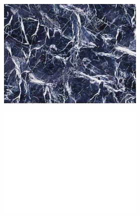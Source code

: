 \begin{figure}[]
    \centering    
    \begin{subfigure}{\textwidth}
        \centering
        \begin{subfigure}{0.19\textwidth}
            \centering
            \includegraphics[width=\textwidth]{images/04-experiment02/isolating_issues/target.jpg}
            \caption*{}
        \end{subfigure}
        \hfill
        \begin{subfigure}{0.19\textwidth}
            \centering
            \includegraphics[width=\textwidth]{images/04-experiment02/isolating_issues/255_bg.jpg}
            \caption*{}

\end{subfigure}
\end{subfigure}
\end{figure}
